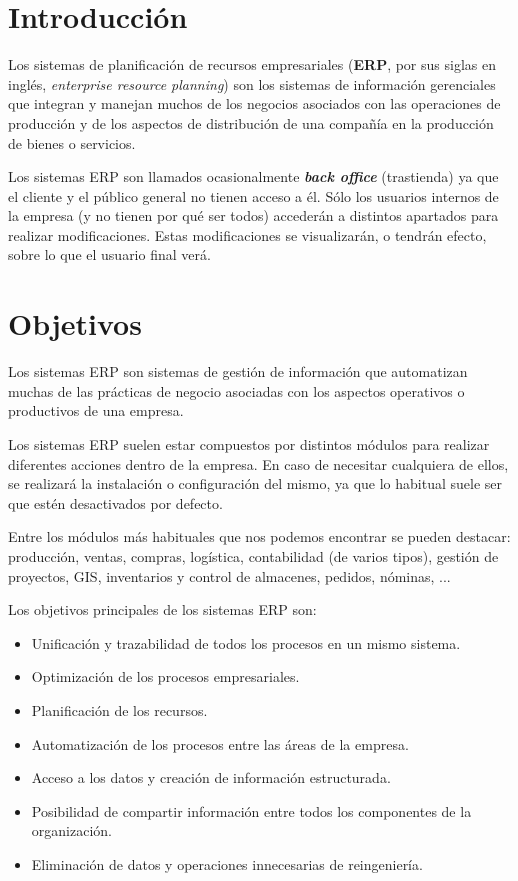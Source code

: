 \chapter{Introducción}

Los sistemas de planificación de recursos empresariales (\textbf{ERP}, por sus siglas en inglés, \textit{enterprise resource planning}) son los sistemas de información gerenciales que integran y manejan muchos de los negocios asociados con las operaciones de producción y de los aspectos de distribución de una compañía en la producción de bienes o servicios.

Los sistemas ERP son llamados ocasionalmente \textit{\textbf{back office}} (trastienda) ya que el cliente y el público general no tienen acceso a él. Sólo los usuarios internos de la empresa (y no tienen por qué ser todos) accederán a distintos apartados para realizar modificaciones. Estas modificaciones se visualizarán, o tendrán efecto, sobre lo que el usuario final verá.

\chapter{Objetivos}

Los sistemas ERP son sistemas de gestión de información que automatizan muchas de las prácticas de negocio asociadas con los aspectos operativos o productivos de una empresa.

Los sistemas ERP suelen estar compuestos por distintos módulos para realizar diferentes acciones dentro de la empresa. En caso de necesitar cualquiera de ellos, se realizará la instalación o configuración del mismo, ya que lo habitual suele ser que estén desactivados por defecto.

Entre los módulos más habituales que nos podemos encontrar se pueden destacar: producción, ventas, compras, logística, contabilidad (de varios tipos), gestión de proyectos, GIS, inventarios y control de almacenes, pedidos, nóminas, ...

Los objetivos principales de los sistemas ERP son:

\begin{itemize}
    \item Unificación y trazabilidad de todos los procesos en un mismo sistema.
    \item Optimización de los procesos empresariales.
    \item Planificación de los recursos.
    \item Automatización de los procesos entre las áreas de la empresa.
    \item Acceso a los datos y creación de información estructurada.
    \item Posibilidad de compartir información entre todos los componentes de la organización.
    \item Eliminación de datos y operaciones innecesarias de reingeniería.
\end{itemize}


